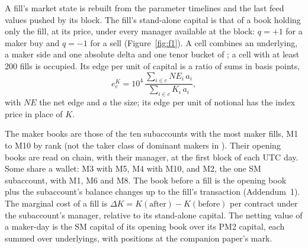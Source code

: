 \documentclass[a4paper,fleqn]{cas-dc}
\begin{document}
A fill's market state is rebuilt from the parameter timelines and the last feed values pushed by its
block. The fill's stand-alone capital is that of a book holding only the fill, at its price, under every
manager available at the block: ${q = +1}$ for a maker buy and ${q = -1}$ for a sell (Figure~\ref{fig:f1}). A
cell combines an underlying, a maker side and one absolute delta and one tenor bucket of \citet{albiez2026}; a
cell with at least 200 fills is occupied. Its edge per unit of capital is a ratio of sums in basis points,
\begin{equation}
  e^{K}_c = 10^4\,\frac{\sum_{i \in c} \mathit{NE}_i\,a_i}{\sum_{i \in c} K_i\,a_i},
\end{equation}
with $\mathit{NE}$ the net edge and $a$ the size; its edge per unit of notional has the index price in place of
$K$.

The maker books are those of the ten subaccounts with the most maker fills, M1 to M10 by rank (not the taker
class of dominant makers in \citet{albiez2026}). Their opening books
are read on chain, with their manager, at the first block of each UTC day. Some share a wallet: M3 with M5, M4
with M10, and M2, the one SM subaccount, with M1, M6 and M8. The book before a fill is the opening book plus the
subaccount's balance changes up to the fill's transaction (Addendum~1). The marginal cost of a fill is
${\Delta K = K(\text{after}) - K(\text{before})}$ per contract under the subaccount's manager, relative to its
stand-alone capital.
The netting value of a maker-day is the SM capital of its opening book over its PM2 capital, each summed over
underlyings, with positions at the companion paper's mark.
\end{document}
